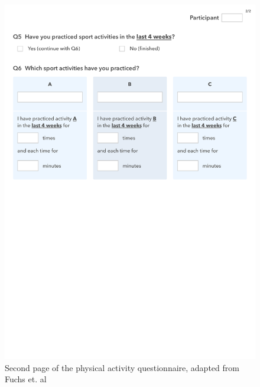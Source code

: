\begin{appendices}
\begin{figure}[htb]
	\centering
	\begin{minipage}[t]{1\linewidth}
		\centering
		\includegraphics[width=1\linewidth]{Pictures/App_BSA-2}
		\caption{Second page of the physical activity questionnaire, adapted from Fuchs et. al~\cite{Fuchs2015-bsa}}
		\label{fig:App_DemographicDataHTG}
	\end{minipage}
\end{figure}

\clearpage


\end{appendices}

